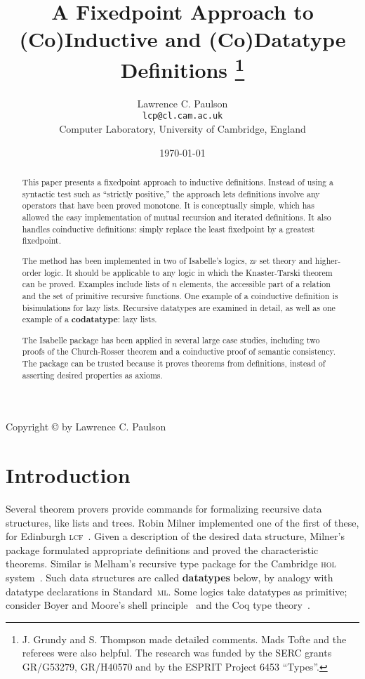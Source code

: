 \documentclass[12pt,a4paper]{article}
\title{A Fixedpoint Approach to\\ 
  (Co)Inductive and (Co)Datatype Definitions%
  \thanks{J. Grundy and S. Thompson made detailed comments.  Mads Tofte and
    the referees were also helpful.  The research was funded by the SERC
    grants GR/G53279, GR/H40570 and by the ESPRIT Project 6453 ``Types''.}}
\author{Lawrence C. Paulson\\{\tt lcp@cl.cam.ac.uk}\\
        Computer Laboratory, University of Cambridge, England}
\date{\today}
\newcommand\defn[1]{{\bf#1}}
\begin{document}
\pagestyle{empty}
\begin{titlepage}
\maketitle 
\begin{abstract}
  This paper presents a fixedpoint approach to inductive definitions.
  Instead of using a syntactic test such as ``strictly positive,'' the
  approach lets definitions involve any operators that have been proved
  monotone.  It is conceptually simple, which has allowed the easy
  implementation of mutual recursion and iterated definitions.  It also
  handles coinductive definitions: simply replace the least fixedpoint by a
  greatest fixedpoint.  

  The method has been implemented in two of Isabelle's logics, \textsc{zf} set
  theory and higher-order logic.  It should be applicable to any logic in
  which the Knaster-Tarski theorem can be proved.  Examples include lists of
  $n$ elements, the accessible part of a relation and the set of primitive
  recursive functions.  One example of a coinductive definition is
  bisimulations for lazy lists.  Recursive datatypes are examined in detail,
  as well as one example of a \defn{codatatype}: lazy lists.

  The Isabelle package has been applied in several large case studies,
  including two proofs of the Church-Rosser theorem and a coinductive proof of
  semantic consistency.  The package can be trusted because it proves theorems
  from definitions, instead of asserting desired properties as axioms.
\end{abstract}
%
\bigskip
\centerline{Copyright \copyright{} \number\year{} by Lawrence C. Paulson}
\thispagestyle{empty} 
\end{titlepage}
\tableofcontents\cleardoublepage\pagestyle{plain}

\setcounter{page}{1}

\section{Introduction}
Several theorem provers provide commands for formalizing recursive data
structures, like lists and trees.  Robin Milner implemented one of the first
of these, for Edinburgh \textsc{lcf}~\cite{milner-ind}.  Given a description
of the desired data structure, Milner's package formulated appropriate
definitions and proved the characteristic theorems.  Similar is Melham's
recursive type package for the Cambridge \textsc{hol} system~\cite{melham89}.
Such data structures are called \defn{datatypes}
below, by analogy with datatype declarations in Standard~\textsc{ml}\@.
Some logics take datatypes as primitive; consider Boyer and Moore's shell
principle~\cite{bm79} and the Coq type theory~\cite{paulin-tlca}.
\end{document}

